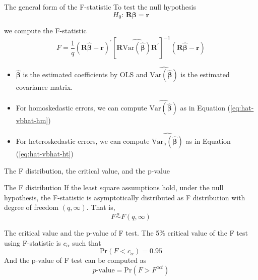 \documentclass[presentation,10pt]{beamer}
\newcommand{\var}{\mathrm{Var}}
\newcommand{\pr}{\mathrm{Pr}}
\begin{document}
\begin{frame}[label={sec:org58a82f3}]{The general form of the F-statistic}
To test the null hypothesis
\[ H_0:\, \mathbf{R}\boldsymbol{\beta} = \mathbf{r} \]

we compute the F-statistic
\begin{equation}
\label{eq:ftest-gen}
F = \frac{1}{q}(\mathbf{R}\hat{\boldsymbol{\beta}} - \mathbf{r})^{\prime} \left[ \mathbf{R} \widehat{\var(\hat{\boldsymbol{\beta}})} \mathbf{R}^{\prime} \right]^{-1} (\mathbf{R}\hat{\boldsymbol{\beta}} - \mathbf{r})
\end{equation}

\begin{itemize}
\item \(\hat{\boldsymbol{\beta}}\) is the estimated coefficients by OLS and
\(\widehat{\var(\hat{\boldsymbol{\beta}})}\) is the estimated covariance
matrix.
\item For homoskedastic errors, we can compute
\(\widehat{\var(\hat{\boldsymbol{\beta}})}\) as in Equation (\ref{eq:hat-vbhat-hm})
\item For heteroskedastic errors, we can compute
\(\widehat{\var_{\mathrm{h}}(\hat{\boldsymbol{\beta}})}\) as in
Equation (\ref{eq:hat-vbhat-ht})
\end{itemize}
\end{frame}

\begin{frame}[label={sec:org933dd36}]{The F distribution, the critical value, and the p-value}
\begin{block}{The F distribution}
If the least square assumptions hold, under the null hypothesis, the
F-statistic is asymptotically distributed as F distribution with
degree of freedom \((q, \infty)\). That is,
\[ F \overset{a}{\sim} F(q, \infty) \]
\end{block}

\begin{block}{The critical value and the p-value of F test.}
The 5\% critical value of the F test using F-statistic is \(c_{\alpha}\)
such that
\[\pr(F < c_{\alpha}) = 0.95\]
And the p-value of F test can be computed as
 \[ p\text{-value} = \pr(F > F^{act})\]
\end{block}
\end{frame}
\end{document}
